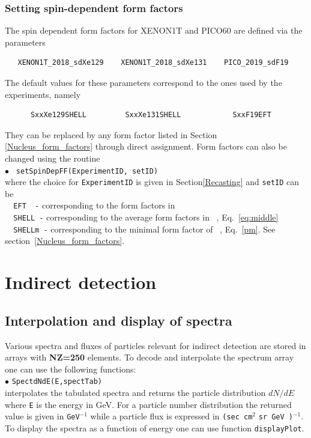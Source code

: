 \documentclass[12pt,a4paper]{article}
\begin{document}
\subsubsection{Setting spin-dependent form factors}  
\label{SDmin}

The spin dependent form factors for XENON1T and PICO60  are defined via the parameters 
\begin{verbatim}
   XENON1T_2018_sdXe129    XENON1T_2018_sdXe131    PICO_2019_sdF19
\end{verbatim}
The default values for these parameters correspond to the ones used by the experiments, namely   
\begin{verbatim}
      SxxXe129SHELL         SxxXe131SHELL            SxxF19EFT  
\end{verbatim}
They can be replaced by any form factor listed  in Section \ref{Nucleus_form_factors} through direct
assignment. Form factors can also be changed using the routine  \\
\noindent
$\bullet$ \verb| setSpinDepFF(ExperimentID, setID)|\\
where the choice for \verb|ExperimentID| is given in Section\ref{Recasting} 
and \verb|setID| can be \\
 \verb|  EFT  -|  corresponding to  the form factors in ~\cite{Fitzpatrick:2012ix}\\
  \verb|  SHELL -|  corresponding to  the average form factors in ~\cite{Klos:2013rwa}, Eq.~\ref{eq:middle}\\
  \verb|  SHELLm -|  corresponding to the  minimal form factor of  ~\cite{Klos:2013rwa}, Eq.~\ref{pm}.  See section~\ref{Nucleus_form_factors}.

  
\section{Indirect detection}

\subsection{Interpolation and display of spectra}
Various spectra and fluxes  of particles  relevant for indirect detection are stored in
arrays with {\bf NZ=250} elements. To decode and interpolate the spectrum array
one can use the following functions:\\

\noindent
$\bullet$  \verb|SpectdNdE(E,spectTab)|\\
interpolates the tabulated spectra  and returns the 
particle distribution $dN/dE$  where \verb|E| is the energy  in GeV. 
For a particle number  distribution the returned value is given in \verb|GeV|$^{-1}$
while  a particle flux is expressed in \verb|(sec cm|$^2$ \verb|sr GeV )|$^{-1}$.\\
To display the  spectra  as a function of energy one can use function {\tt displayPlot}.\\
\end{document}
